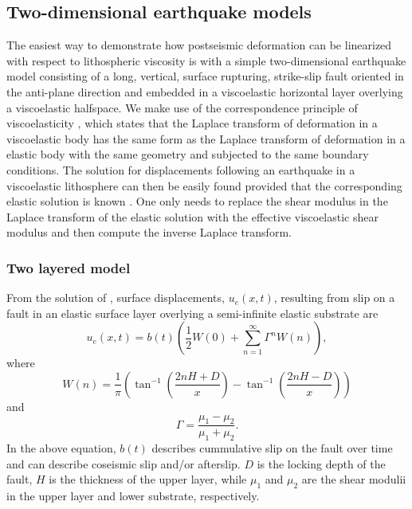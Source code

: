 \documentclass[extra]{gji}
\begin{document}
\subsection{Two-dimensional earthquake models}
The easiest way to demonstrate how postseismic deformation can be
linearized with respect to lithospheric viscosity is with a simple
two-dimensional earthquake model consisting of a long, vertical,
surface rupturing, strike-slip fault oriented in the anti-plane
direction and embedded in a viscoelastic horizontal layer overlying a
viscoelastic halfspace.  We make use of the correspondence principle
of viscoelasticity \citep[e.g.][]{F1975}, which states that the
Laplace transform of deformation in a viscoelastic body has the same
form as the Laplace transform of deformation in a elastic body with
the same geometry and subjected to the same boundary conditions. The
solution for displacements following an earthquake in a viscoelastic
lithosphere can then be easily found provided that the corresponding
elastic solution is known \citep[e.g.][]{HH2005,NM1974,SP1978}.  One
only needs to replace the shear modulus in the Laplace transform of
the elastic solution with the effective viscoelastic shear modulus and
then compute the inverse Laplace transform.

\subsubsection{Two layered model}
From the solution of \citet{R1971}, surface displacements,
$u_{e}(x,t)$, resulting from slip on a fault in an elastic surface
layer overlying a semi-infinite elastic substrate are
\begin{equation}\label{TwoLayerElastic}
  u_{e}(x,t) = b(t)\left(\frac{1}{2} W(0) + 
    \sum_{n=1}^\infty \Gamma^nW(n)\right),
\end{equation}
where
\begin{equation}
  W(n) = \frac{1}{\pi}\left(\tan^{-1}\left(\frac{2nH + D}{x}\right) 
    - \tan^{-1}\left(\frac{2nH - D}{x}\right)\right)
\end{equation}
and
\begin{equation}
  \Gamma = \frac{\mu_1 - \mu_2}{\mu_1 + \mu_2}.
\end{equation}
In the above equation, $b(t)$ describes cummulative slip on the fault
over time and can describe coseismic slip and/or afterslip. $D$ is the
locking depth of the fault, $H$ is the thickness of the upper layer,
while $\mu_1$ and $\mu_2$ are the shear modulii in the upper layer and
lower substrate, respectively.
\end{document}
